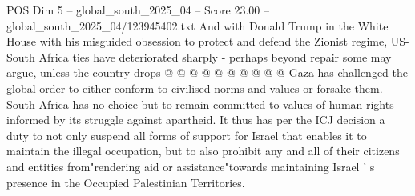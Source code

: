 \begin{textsample}{POS Dim 5 – global\_south\_2025\_04 – Score 23.00 – global\_south\_2025\_04/123945402.txt}
And with Donald Trump in the White House with his misguided obsession to protect and defend the Zionist regime, US-South Africa ties have deteriorated sharply - perhaps beyond repair some may argue, unless the country drops @ @ @ @ @ @ @ @ @ @ Gaza has challenged the global order to either conform to civilised norms and values or forsake them.
South Africa has no choice but to remain committed to values of human rights informed by its struggle against apartheid.
It thus has per the ICJ decision a duty to not only suspend all forms of support for Israel that enables it to maintain the illegal occupation, but to also prohibit any and all of their citizens and entities from"rendering aid or assistance"towards maintaining Israel ' s presence in the Occupied Palestinian Territories.

\end{textsample}
